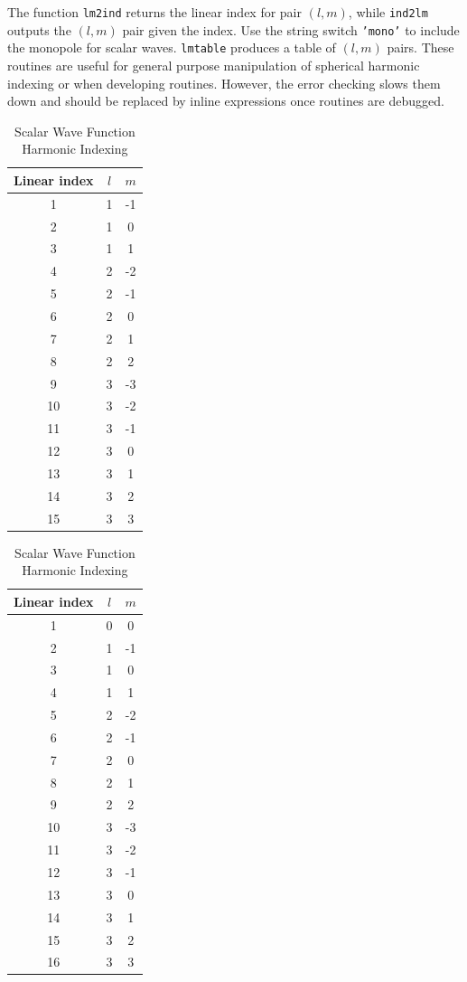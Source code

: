 The function \texttt{lm2ind} returns the linear index for pair $(l,m)$, while \texttt{ind2lm} outputs the $(l,m)$ pair given the index.   Use the string switch \texttt{'mono'} to include the monopole for scalar waves. \texttt{lmtable} produces a table of $(l,m)$ pairs. These routines are useful for general purpose manipulation of spherical harmonic indexing or when developing routines. However, the error checking slows them down and should be replaced by inline expressions once routines are debugged.  



\begin{table}[H]
\parbox{.45\linewidth}{
\caption{Vector Wave Function Harmonic Indexing}
\centering
\begin{tabular}{|c|c|c|}
\hline
Linear index & $l$ & $m$ \\
\hline
1 &      1  &  -1 \\
2 &      1  &   0\\
3 &      1  &   1\\
\hline
4 &      2  &  -2\\
5 &      2   & -1\\
6 &      2   &  0\\
7 &      2   &  1\\
8 &      2   &  2\\
\hline
9 &      3   & -3\\
10 &      3  &  -2\\
11 &      3  &  -1\\
12 &      3  &   0\\
13 &      3   &  1\\
14 &      3   &  2\\
15 &      3  &   3 \\
\hline
\end{tabular}
\label{linearindexvec}
}
\hfill
\parbox{.45\linewidth}{
\centering
\caption{Scalar Wave Function Harmonic Indexing}
\centering
\begin{tabular}{|c|c|c|}
\hline
Linear index & $l$ & $m$ \\
\hline
1 & 	0 & 0 \\
\hline
2 &      1  &  -1 \\
3 &      1  &   0\\
4 &      1  &   1\\
\hline
5 &      2  &  -2\\
6 &      2   & -1\\
7 &      2   &  0\\
8 &      2   &  1\\
9 &      2   &  2\\
\hline
10 &      3   & -3\\
11 &      3  &  -2\\
12 &      3  &  -1\\
13 &      3  &   0\\
14 &      3   &  1\\
15 &      3   &  2\\
16 &      3  &   3 \\
\hline
\end{tabular}
\label{linearindexmono}
}
\end{table}


